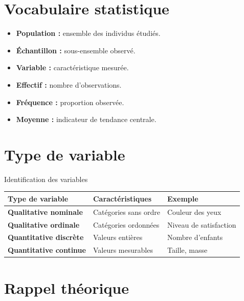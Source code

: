 \documentclass[11pt,a4paper]{article}
\begin{document}
\section{Vocabulaire statistique}

\begin{cadretheorie}
\begin{itemize}
    \item \textbf{Population :} ensemble des individus étudiés.
    \item \textbf{Échantillon :} sous-ensemble observé.
    \item \textbf{Variable :} caractéristique mesurée.
    \item \textbf{Effectif :} nombre d’observations.
    \item \textbf{Fréquence :} proportion observée.
    \item \textbf{Moyenne :} indicateur de tendance centrale.
\end{itemize}
\end{cadretheorie}

\section{Type de variable}

\begin{cadregris}{Identification des variables}
\renewcommand{\arraystretch}{1.35}
\begin{tabularx}{\textwidth}{>{\bfseries}p{4cm}X X}
\toprule
Type de variable & Caractéristiques & Exemple \\
\midrule
Qualitative nominale & Catégories sans ordre & Couleur des yeux \\
Qualitative ordinale & Catégories ordonnées & Niveau de satisfaction \\
Quantitative discrète & Valeurs entières & Nombre d’enfants \\
Quantitative continue & Valeurs mesurables & Taille, masse \\
\bottomrule
\end{tabularx}
\end{cadregris}

\section{Rappel théorique}
\end{document}
